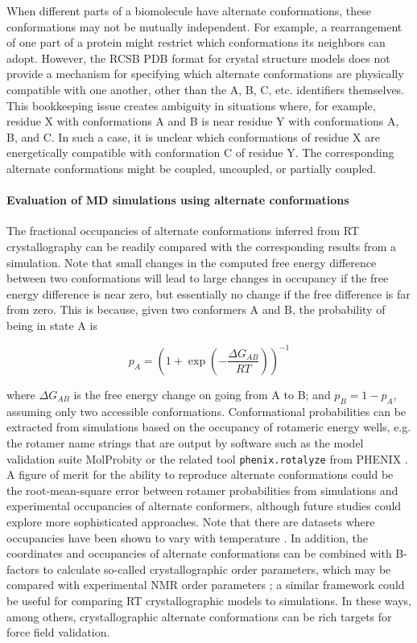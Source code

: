 \documentclass[9pt,review]{livecoms}
\begin{document}
When different parts of a biomolecule have alternate conformations, these conformations may not be mutually independent.
For example, a rearrangement of one part of a protein might restrict which conformations its neighbors can adopt.
However, the RCSB PDB format for crystal structure models does not provide a mechanism for specifying which alternate conformations are physically compatible with one another, other than the A, B, C, etc. identifiers themselves.
This bookkeeping issue creates ambiguity in situations where, for example, residue X with conformations A and B is near residue Y with conformations A, B, and C.
In such a case, it is unclear which conformations of residue X are energetically compatible with conformation C of residue Y.
The corresponding alternate conformations might be coupled, uncoupled, or partially coupled.

\paragraph{Evaluation of MD simulations using alternate conformations}

The fractional occupancies of alternate conformations inferred from RT crystallography can be readily compared with the corresponding results from a simulation.
Note that small changes in the computed free energy difference between two conformations will lead to large changes in occupancy if the free energy difference is near zero, but essentially no change if the free difference is far from zero.
This is because, given two conformers A and B, the probability of being in state A is

\begin{equation}
\label{eqn:alt_confs}
p_A = \left( 1 + \exp \left(- \frac {\Delta G_{AB}} {R T} \right) \right )^{-1}
\end{equation}

\noindent where $\Delta G_{AB}$ is the free energy change on going from A to B; and $p_B = 1-p_A$, assuming only two accessible conformations.
Conformational probabilities can be extracted from simulations based on the occupancy of rotameric energy wells, e.g. the rotamer name strings \cite{lovell_penultimate_2000} that are output by software such as the model validation suite MolProbity \cite{williams_molprobity_2018} or the related tool \verb|phenix.rotalyze| from PHENIX \cite{liebschner_macromolecular_2019}.
A figure of merit for the ability to reproduce alternate conformations could be the root-mean-square error between rotamer probabilities from simulations and experimental occupancies of alternate conformers, although future studies could explore more sophisticated approaches.
Note that there are datasets where occupancies have been shown to vary with temperature \cite{cbradford_temperature_2021}.
In addition, the coordinates and occupancies of alternate conformations can be combined with B-factors to calculate so-called crystallographic order parameters, which may be compared with experimental NMR order parameters \cite{fenwick_integrated_2014}; a similar framework could be useful for comparing RT crystallographic models to simulations.
In these ways, among others, crystallographic alternate conformations can be rich targets for force field validation. 
\end{document}

